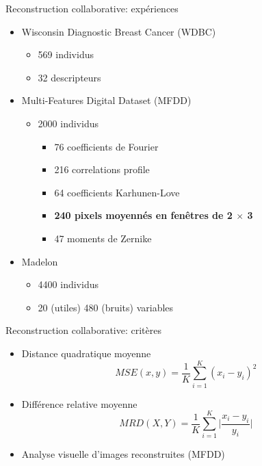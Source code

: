 \documentclass[hyperref={pdfpagelabels=false}]{beamer}
\begin{document}
    \begin{frame}{Reconstruction collaborative: expériences}
        \begin{itemize}
            \item Wisconsin Diagnostic Breast Cancer (WDBC)
                \begin{itemize}
                    \item 569 individus
                    \item 32 descripteurs
                \end{itemize}
            \item Multi-Features Digital Dataset (MFDD)
                \begin{itemize}
                    \item 2000 individus
                    \begin{itemize}
                        \item 76 coefficients de Fourier
                        \item 216 correlations profile
                        \item 64 coefficients Karhunen-Love
                        \item\textbf{240 pixels moyennés en fenêtres de 2 
                            $\times$ 3}
                        \item 47 moments de Zernike
                    \end{itemize}
                \end{itemize}
            \item Madelon
                \begin{itemize}
                    \item 4400 individus
                    \item 20 (utiles) 480 (bruits) variables
                \end{itemize}
        \end{itemize}
    \end{frame}

    \begin{frame}{Reconstruction collaborative: critères}
        \begin{itemize}
            \item Distance quadratique moyenne
                \begin{equation*}
                    MSE(x, y) = \frac{1}{K}\sum_{i = 1}^{K}(x_i - y_i)^2
                \end{equation*}
            \item Différence relative moyenne
                \begin{equation*}
                    MRD(X, Y) = \frac{1}{K}\sum_{i=1}^{K}\Big|\frac{x_i - y_i}{y_i}\Big|
                \end{equation*}
            \item Analyse visuelle d'images reconstruites (MFDD)
        \end{itemize}
    \end{frame}
\end{document}
